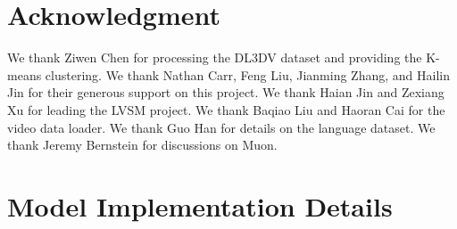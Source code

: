 \documentclass{article}
\begin{document}
\section*{Acknowledgment}

We thank Ziwen Chen for processing the DL3DV dataset and providing the K-means clustering.
We thank Nathan Carr, Feng Liu, Jianming Zhang, and Hailin Jin for their generous support on this project. 
We thank Haian Jin and Zexiang Xu for leading the LVSM project. 
We thank Baqiao Liu and Haoran Cai for the video data loader. We thank Guo Han for details on the language dataset. We thank Jeremy Bernstein for discussions on Muon. 

{\small


}

\newpage
\appendix

\section{\methodname{} Model Implementation Details }
\label{sec:appen_lact_details}
\end{document}
